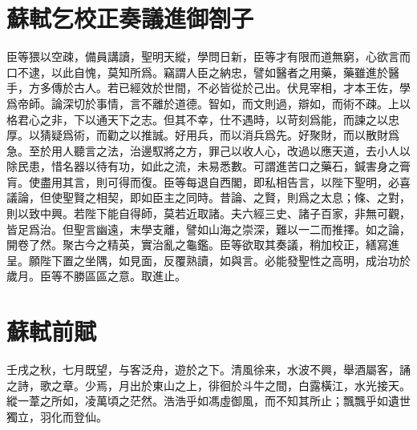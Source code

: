 \section[乞校正陸贄奏議進御劄子\quad{\small 蘇軾}]{{\normalsize 蘇軾}\quad 乞校正奏議進御劄子}
臣等猥以空疎，備員講讀，聖明天縱，學問日新，臣等才有限而道無窮，心欲言而口不逮，以此自愧，莫知所爲。竊謂人臣之納忠，譬如醫者之用藥，藥雖進於醫手，方多傳於古人。若已經效於世間，不必皆從於己出。伏見宰相，才本王佐，學爲帝師。論深切於事情，言不離於道德。智如，而文則過，辯如，而術不疎。上以格君心之非，下以通天下之志。但其不幸，仕不遇時，以苛刻爲能，而諫之以忠厚。以猜{疑}爲術，而勸之以推誠。好用兵，而以消兵爲先。好聚財，而以散財爲急。至於用人聽言之法，治邊{馭}將之方，罪己以收人心，改過以應天道，去小人以除民患，惜名器以待有功，如此之流，未易悉數。可謂進苦口之藥石，鍼害身之膏肓。使盡用其言，則可得而復。臣等每退自西閣，即私相告言，以陛下聖明，必喜議論，但使聖賢之相契，即如臣主之同時。昔論、之賢，則爲之太息；條、之對，則以致中興。若陛下能自得師，莫若近取諸。夫六經三史、諸子百家，非無可觀，皆足爲治。但聖言幽遠，末學支離，譬如山海之崇深，難以一二而推擇。如之論，開卷了然。聚古今之精英，實治亂之龜鑑。臣等欲取其奏議，稍加校正，繕寫進呈。願陛下置之坐隅，如見面，反覆熟讀，如與言。必能發聖性之高明，成治功於歲月。臣等不勝區區之意。取進止。%

\theendnotes

\section[前赤壁賦\quad{\small 蘇軾}]{{\normalsize 蘇軾}\quad 前賦}
壬戌之秋，七月既望，与客泛舟，遊於之下。清風徐来，水波不興，舉酒屬客，誦之詩，歌之章。少焉，月出於東山之上，徘徊於斗牛之間，白露橫江，水光接天。縱一葦之所如，凌萬頃之茫然。浩浩乎如馮虛御風，而不知其所止；飄飄乎如遺世獨立，羽化而登仙。

